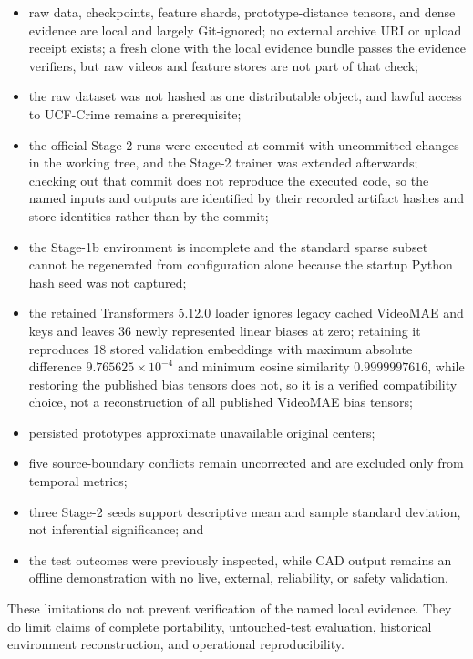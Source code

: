 \begin{itemize}
    \item raw data, checkpoints, feature shards, prototype-distance tensors, and dense evidence are local and largely Git-ignored; no external archive URI or upload receipt exists; a fresh clone with the local evidence bundle passes the evidence verifiers, but raw videos and feature stores are not part of that check;
    \item the raw dataset was not hashed as one distributable object, and lawful access to UCF-Crime remains a prerequisite;
    \item the official Stage-2 runs were executed at commit  with uncommitted changes in the working tree, and the Stage-2 trainer was extended afterwards; checking out that commit does not reproduce the executed code, so the named inputs and outputs are identified by their recorded artifact hashes and store identities rather than by the commit;
    \item the Stage-1b environment is incomplete and the standard sparse subset cannot be regenerated from configuration alone because the startup Python hash seed was not captured;
    \item the retained Transformers 5.12.0 loader ignores legacy cached VideoMAE  and  keys and leaves 36 newly represented linear biases at zero; retaining it reproduces 18 stored validation embeddings with maximum absolute difference $9.765625\times10^{-4}$ and minimum cosine similarity $0.9999997616$, while restoring the published bias tensors does not, so it is a verified compatibility choice, not a reconstruction of all published VideoMAE bias tensors;
    \item persisted  prototypes approximate unavailable original  centers;
    \item five source-boundary conflicts remain uncorrected and are excluded only from temporal metrics;
    \item three Stage-2 seeds support descriptive mean and sample standard deviation, not inferential significance; and
    \item the test outcomes were previously inspected, while CAD output remains an offline demonstration with no live, external, reliability, or safety validation.
\end{itemize}

These limitations do not prevent verification of the named local evidence. They do limit claims of complete portability, untouched-test evaluation, historical environment reconstruction, and operational reproducibility.

